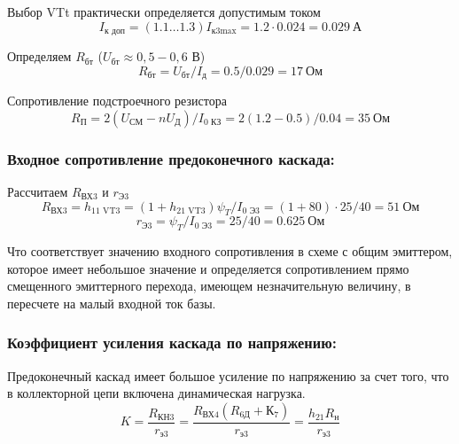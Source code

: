 Выбор VTt практически определяется допустимым током
\begin{equation}
\label{eq:equation3_12}
 I_{\text{к доп}} = (1.1 \ldots 1.3) I_{\text{к3max}} = 1.2 \cdot 0.024 = 0.029~\text{А}
\end{equation}

Определяем $R_{\text{бт}}$ ($U_{\text{бт}} \approx 0,5 - 0,6$ В)
\begin{equation}
\label{eq:equation3_13}
 R_{\text{бт}} = U_{\text{бт}} / I_{\text{д}} = 0.5/0.029 = 17~\text{Ом}
\end{equation}

Сопротивление подстроечного резистора
\begin{equation}
\label{eq:equation3_14}
 R_{\text{П}} = 2 (U_{\text{СМ}} - n U_{\text{Д}}) / I_{\text{0 КЗ}} = 2 (1.2 - 0.5) / 0.04 = 35~\text{Ом}
\end{equation}

\subsubsection{Входное сопротивление предоконечного каскада:}
Рассчитаем $R_{\text{ВХ3}}$ и $r_{\text{Э3}}$
\begin{equation}
\label{eq:equation3_15}
 R_{\text{ВХ3}} = h_{\text{11 VT3}} = (1 + h_{\text{21 VT3}}) \psi_T / I_{\text{0 Э3}} = (1 + 80) \cdot 25 / 40 = 51~\text{Ом}
\end{equation}
\begin{equation}
\label{eq:equation3_16}
 r_{\text{Э3}} = \psi_T / I_{\text{0 Э3}} = 25/40 = 0.625~\text{Ом}
\end{equation}

Что соответствует значению входного сопротивления в схеме с общим эмиттером, которое имеет небольшое значение и определяется сопротивлением прямо смещенного эмиттерного перехода, имеющем незначительную величину, в пересчете на малый входной ток базы.

\subsubsection{Коэффициент усиления каскада по напряжению:}

Предоконечный каскад имеет большое усиление по напряжению за счет того, что в коллекторной цепи включена динамическая нагрузка.
\begin{equation}
\label{eq:equation3_17}
 K = \dfrac{R_{\text{КН3}}}{r_{\text{э3}}} = \dfrac{R_{\text{ВХ4}} ( R_{\text{6Д}} + К_7)}{ r_{\text{э3}}} = \dfrac{h_{21} R_{н}}{r_{\text{э3}}}
\end{equation}
\begin{equation*}
 
\end{equation*}

